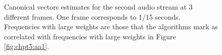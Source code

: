 \begin{figure}
  \begin{center}
    \caption{Canonical vectors estimates for the second audio stream at 3 different
      frames. One frame corresponds to 1/15 seconds. Frequencies with large weights are
      those that the algorithms mark as correlated with frequencies with large weights in
      Figure \ref{fig:chpt5:aa1}.}
    \label{fig:chpt5:aa2}
  \end{center}
\end{figure}



